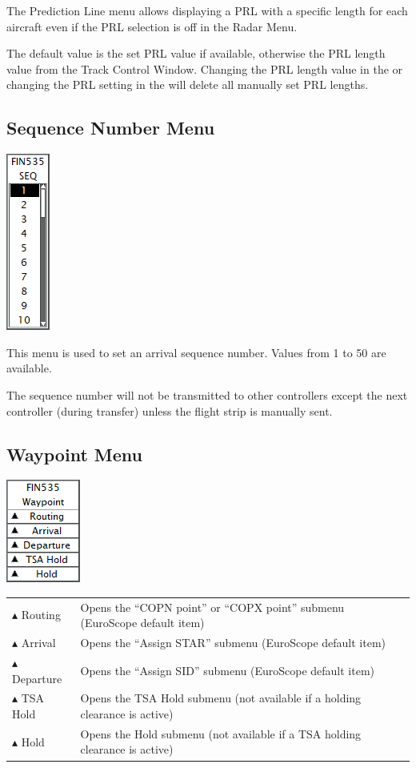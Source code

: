 \documentclass[11pt,a4paper]{memoir}
\begin{document}
The Prediction Line menu allows displaying a PRL with a specific length for each aircraft even if the PRL selection is off in the Radar Menu.

The default value is the set PRL value if available, otherwise the PRL length value from the Track Control Window. Changing the PRL length value in the \textit{} or changing the PRL setting in the \textit{} will delete all manually set PRL lengths.

\subsection{Sequence Number Menu}
\label{menu:seq}

\includegraphics{img/seq.png}

This menu is used to set an arrival sequence number. Values from 1 to 50 are available.

The sequence number will not be transmitted to other controllers except the next
controller (during transfer) unless the flight strip is manually sent.

\subsection{Waypoint Menu}
\label{menu:wpt}

\includegraphics{img/wpt.png}

\begin{tabular}{l l}
$\blacktriangle$  Routing & Opens the “COPN point” or “COPX point” submenu (EuroScope default item)
\\$\blacktriangle$ Arrival & Opens the “Assign STAR” submenu (EuroScope default item)
\\$\blacktriangle$ Departure & Opens the “Assign SID” submenu (EuroScope default item)
\\$\blacktriangle$ TSA Hold & Opens the TSA Hold submenu (not available if a holding clearance is active)
\\$\blacktriangle$ Hold & Opens the Hold submenu (not available if a TSA holding clearance is active)
\end{tabular}
\end{document}
